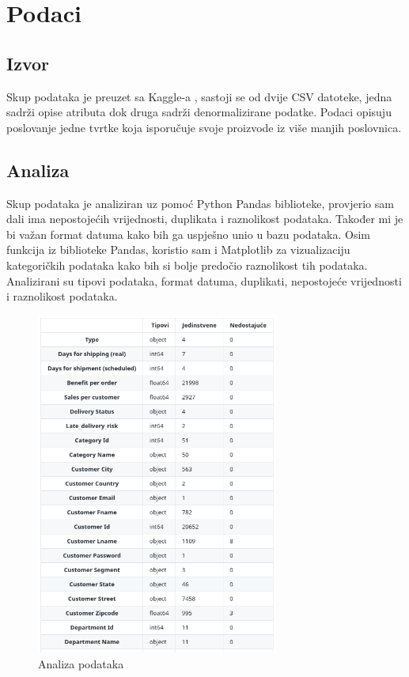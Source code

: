 \documentclass[12pt, oneside]{book}
\begin{document}
\chapter{Podaci}


\section{Izvor}
Skup podataka je preuzet sa Kaggle-a \cite{dataco}, sastoji se od dvije CSV datoteke, jedna sadrži opise atributa dok druga sadrži denormalizirane podatke. Podaci opisuju poslovanje jedne tvrtke koja isporučuje svoje proizvode iz više manjih poslovnica.


\section{Analiza}
Skup podataka je analiziran uz pomoć Python Pandas biblioteke, provjerio sam dali ima nepostojećih vrijednosti, duplikata i raznolikost podataka. Također mi je bi važan format datuma kako bih ga uspješno unio u bazu podataka. Osim funkcija iz biblioteke Pandas, koristio sam i Matplotlib za vizualizaciju kategoričkih podataka kako bih si bolje predočio raznolikost tih podataka. Analizirani su tipovi podataka, format datuma, duplikati, nepostojeće vrijednosti i raznolikost podataka. 


\begin{figure}[h]
\includegraphics[width=8cm]{images/i12_Python-Anal-Table.png}
\centering
\caption{Analiza podataka}
\end{figure}
\end{document}

